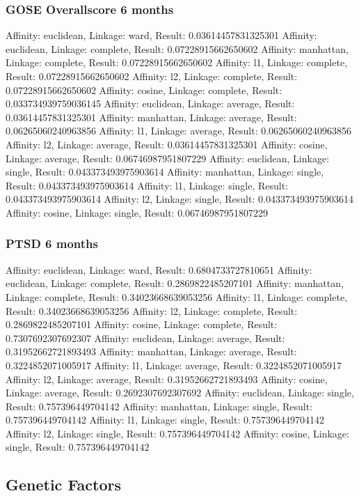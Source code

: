 \documentclass[11pt]{article}
\begin{document}
\subsubsection{GOSE Overallscore 6 months}
Affinity: euclidean, Linkage: ward,      Result: 0.03614457831325301
Affinity: euclidean, Linkage: complete,  Result: 0.07228915662650602
Affinity: manhattan, Linkage: complete,  Result: 0.07228915662650602
Affinity: l1,        Linkage: complete,  Result: 0.07228915662650602
Affinity: l2,        Linkage: complete,  Result: 0.07228915662650602
Affinity: cosine,    Linkage: complete,  Result: 0.033734939759036145
Affinity: euclidean, Linkage: average,   Result: 0.03614457831325301
Affinity: manhattan, Linkage: average,   Result: 0.06265060240963856
Affinity: l1,        Linkage: average,   Result: 0.06265060240963856
Affinity: l2,        Linkage: average,   Result: 0.03614457831325301
Affinity: cosine,    Linkage: average,   Result: 0.06746987951807229
Affinity: euclidean, Linkage: single,    Result: 0.043373493975903614
Affinity: manhattan, Linkage: single,    Result: 0.043373493975903614
Affinity: l1,        Linkage: single,    Result: 0.043373493975903614
Affinity: l2,        Linkage: single,    Result: 0.043373493975903614
Affinity: cosine,    Linkage: single,    Result: 0.06746987951807229
\subsubsection{PTSD 6 months}
Affinity: euclidean, Linkage: ward,      Result: 0.6804733727810651
Affinity: euclidean, Linkage: complete,  Result: 0.2869822485207101
Affinity: manhattan, Linkage: complete,  Result: 0.34023668639053256
Affinity: l1,        Linkage: complete,  Result: 0.34023668639053256
Affinity: l2,        Linkage: complete,  Result: 0.2869822485207101
Affinity: cosine,    Linkage: complete,  Result: 0.7307692307692307
Affinity: euclidean, Linkage: average,   Result: 0.31952662721893493
Affinity: manhattan, Linkage: average,   Result: 0.3224852071005917
Affinity: l1,        Linkage: average,   Result: 0.3224852071005917
Affinity: l2,        Linkage: average,   Result: 0.31952662721893493
Affinity: cosine,    Linkage: average,   Result: 0.2692307692307692
Affinity: euclidean, Linkage: single,    Result: 0.757396449704142
Affinity: manhattan, Linkage: single,    Result: 0.757396449704142
Affinity: l1,        Linkage: single,    Result: 0.757396449704142
Affinity: l2,        Linkage: single,    Result: 0.757396449704142
Affinity: cosine,    Linkage: single,    Result: 0.757396449704142
\subsection{Genetic Factors}
\end{document}
